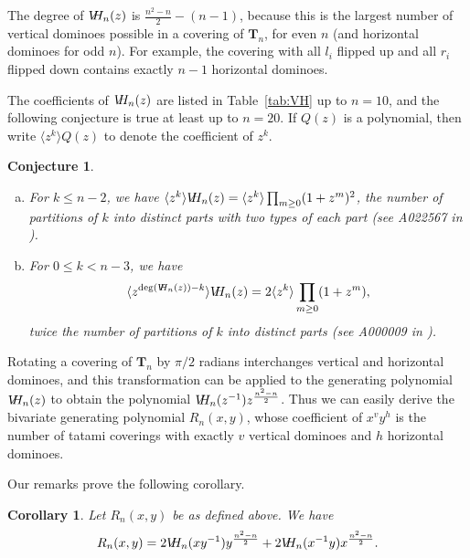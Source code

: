 \documentclass[12pt]{amsart}
\newtheorem{corollary}{Corollary}
\newtheorem{conjecture}{Conjecture}
\newcommand{\tabref}[1]{Table~\ref{tab:#1}}
\newcommand{\Tn}[1]{\mathbf T_{#1}}
\newcommand{\vh}{V\hspace{-5pt}H}
\begin{document}
The degree of $\vh_n(z)$ is $\frac{n^2-n}{2}-(n-1)$, because this is
the largest number of vertical dominoes possible in a covering of
$\Tn{n}$, for even $n$ (and horizontal dominoes for odd $n$).  For
example, the covering with all $l_i$ flipped up and all $r_i$ flipped
down contains exactly $n-1$ horizontal dominoes.

\newcommand{\coeff}[1]{\langle z^{#1}\rangle}

The coefficients of $\vh_n(z)$ are listed in \tabref{VH} up to $n =
10$, and the following conjecture is true at least up to $n=20$.  If
$Q(z)$ is a polynomial, then write $\coeff{k}Q(z)$ to denote the
coefficient of $z^k$.

\begin{conjecture}~ %
  \label{conj:vhcon}
  \begin{enumerate}[(a)]
  \item For $k\le n-2$, we have $\coeff{k}\vh_n(z) =
    \coeff{k}\prod_{m\ge 0}(1+z^m)^2$, the number of partitions of $k$
    into distinct parts with two types of each part (see A022567 in
    \cite{Sloane}).
  \item For $0\le k < n-3$, we have
    \begin{align*}
      \coeff{\deg\left(\vh_n(z)\right)-k}\vh_n(z) =
      2\coeff{k}\prod_{m\ge 0}(1+z^m),
    \end{align*}
    twice the number of partitions of $k$ into
      distinct parts (see A000009 in \cite{Sloane}).
  \end{enumerate}
\end{conjecture}



\begin{sloppypar}
  Rotating a covering of $\Tn{n}$ by $\pi/2$ radians interchanges
  vertical and horizontal dominoes, and this transformation can be
  applied to the generating polynomial $\vh_n(z)$ to obtain the
  polynomial $\vh_n(z^{-1})z^{\frac{n^2-n}{2}}$.  Thus we can easily
  derive the bivariate generating polynomial $R_n(x,y)$, whose
  coefficient of $x^vy^h$ is the number of tatami coverings with
  exactly $v$ vertical dominoes and $h$ horizontal dominoes.
\end{sloppypar}

Our remarks prove the following corollary.

\begin{corollary}
  Let $R_n(x,y)$ be as defined above.  We have
  \begin{align}
    \label{eq:rnz}
    R_n(x,y) = 2\vh_n(xy^{-1})y^{\frac{n^2-n}{2}} +
    2\vh_n(x^{-1}y)x^{\frac{n^2-n}{2}}.
  \end{align}
\end{corollary}
\end{document}
